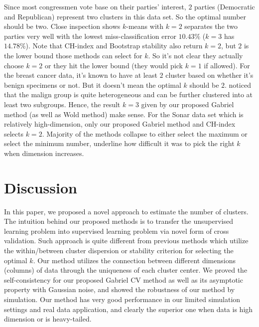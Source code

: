 \documentclass[12pt]{article}
\begin{document}
Since most congressmen vote base on their parties' interest, $2$ parties
(Democratic and Republican) represent two clusters in this data set. So the
optimal number should be two. Close inspection shows $k$-means with
$k=2$ separates the two parties very well with the lowest miss-classification
error $10.43\%$ ($k=3$ has $14.78\%$). Note that CH-index and Bootstrap
stability also return $k=2$, but $2$ is the lower bound those methods can
select for $k$. So it's not clear they actually choose $k=2$ or they hit the
lower bound (they would pick $k=1$ if allowed). For the breast cancer data,
it's known to have at least $2$ cluster based on whether it's benign specimens
or not. But it doesn't mean the optimal $k$ should be $2$.
\cite{fujita2014non} noticed that the malign group is quite heterogeneous and
can be further clustered into at least two subgroups. Hence, the result $k=3$
given by our proposed Gabriel method (as well as Wold method) make sense. For
the Sonar data set which is relatively high-dimension, only our proposed
Gabriel method and CH-index selects $k=2$. Majority of the methods collapse to
either select the maximum or select the minimum number, underline how
difficult it was to pick the right $k$ when dimension increases. 

\section{Discussion}
\label{sec:conc}
In this paper, we proposed a novel approach to estimate the number of
clusters. The intuition behind our proposed methods is to transfer the
unsupervised learning problem into supervised learning problem via novel form
of cross validation. Such approach is quite different from previous methods which 
utilize the within/between cluster dispersion or stability criterion for selecting the 
optimal $k$. Our method utilizes the connection between different dimensions (columns)
of data through the uniqueness of each cluster center. We proved the self-consistency 
for our proposed Gabriel CV method as well as its asymptotic property with Gaussian noise,
and showed the robustness of our method by simulation. Our method has very good performance
in our limited simulation settings and real data application, and clearly the superior
one when data is high dimension or is heavy-tailed.
\end{document}
